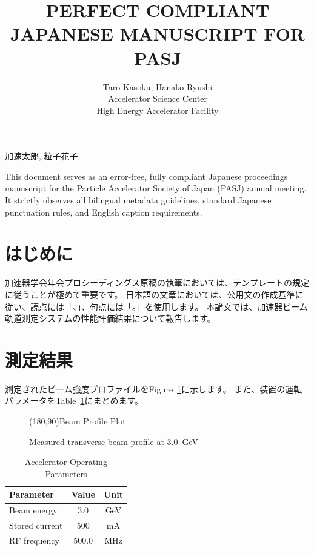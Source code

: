 \documentclass{PASJ2026}
\begin{document}
\title{PERFECT COMPLIANT JAPANESE MANUSCRIPT FOR PASJ}

\jauthor
{
加速太郎,
粒子花子
}

\author
{
Taro Kasoku,
Hanako Ryushi\\
 Accelerator Science Center\\
 High Energy Accelerator Facility\\
}

\Abstract
{
This document serves as an error-free, fully compliant Japanese proceedings manuscript for the Particle Accelerator Society of Japan (PASJ) annual meeting. It strictly observes all bilingual metadata guidelines, standard Japanese punctuation rules, and English caption requirements.
}

\maketitle

\section{はじめに}
加速器学会年会プロシーディングス原稿の執筆においては、テンプレートの規定に従うことが極めて重要です。
日本語の文章においては、公用文の作成基準に従い、読点には「、」、句点には「。」を使用します。
本論文では、加速器ビーム軌道測定システムの性能評価結果について報告します。

\section{測定結果}
測定されたビーム強度プロファイルをFigure~\ref{fig:profile}に示します。
また、装置の運転パラメータをTable~\ref{tab:params}にまとめます。

\begin{figure}[htb]
\centering
\framebox(180,90){Beam Profile Plot}
\caption{Measured transverse beam profile at 3.0~GeV}
\label{fig:profile}
\end{figure}

\begin{table}[htb]
\caption{Accelerator Operating Parameters}
\label{tab:params}
\centering
\begin{tabular}{lcc}
\hline
Parameter & Value & Unit \\
\hline
Beam energy & 3.0 & GeV \\
Stored current & 500 & mA \\
RF frequency & 500.0 & MHz \\
\hline
\end{tabular}
\end{table}
\end{document}
